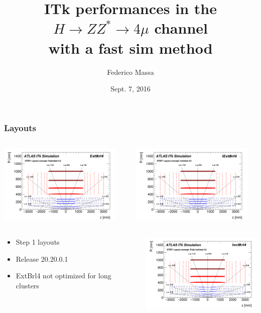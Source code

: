\documentclass{beamer}
\title{ITk performances in the
$H \rightarrow ZZ^{*} \rightarrow 4\mu$ channel \\
with a fast sim method}
\author{Federico Massa}
\institute{ITk Simulation \& Performance}
\date{Sept. 7, 2016}
\begin{document}
\begin{frame}
\titlepage
\end{frame}


\begin{frame}
\frametitle{Layouts}
\begin{columns}
\begin{column}{0.5\textwidth}
\includegraphics[width=\textwidth,height=3.8cm]{ExtBrl4}
\end{column}
\begin{column}{0.5\textwidth}
\includegraphics[width=\textwidth,height=3.8cm]{IExtBrl4}
\end{column}
\end{columns}

\begin{columns}
\begin{column}{0.5\textwidth}
\begin{itemize}
\item Step 1 layouts
\item Release 20.20.0.1
\item ExtBrl4 not optimized for long clusters
\end{itemize}
\end{column}
\begin{column}{0.5\textwidth}
\includegraphics[width=\textwidth,height=3.8cm]{InclBrl4}
\end{column}
\end{columns}

\end{frame}
\end{document}

